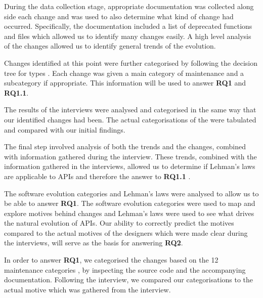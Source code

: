 \documentclass{sig-alternate}
\begin{document}
During the data collection stage, appropriate documentation was collected along side each change and was used to also determine what kind of change had occurred. Specifically, the documentation included a list of deprecated functions and files which allowed us to identify many changes easily. A high level analysis of the changes allowed us to identify general trends of the evolution.

Changes identified at this point were further categorised by following the decision tree for types \cite{chapin2001types}. Each change was given a main category of maintenance and a subcategory if appropriate. This information will be used to answer \textbf{RQ1} and \textbf{RQ1.1}.

The results of the interviews were analysed and categorised in the same way that our identified changes had been. The actual categorisations of the were tabulated and compared with our initial findings.

The final step involved analysis of both the trends and the changes, combined with information gathered during the interview. These trends, combined with the information gathered in the interviews, allowed us to determine if Lehman's laws are applicable to APIs and therefore the answer to \textbf{RQ1.1} \cite{lehman1980programs}.

The software evolution categories \cite{chapin2001types} and Lehman's laws \cite{lehman1980programs} were analysed to allow us to be able to answer \textbf{RQ1}. The software evolution categories were used to map and explore motives behind changes and Lehman's laws were used to see what drives the natural evolution of APIs. Our ability to correctly predict the motives compared to the actual motives of the designers which were made clear during the interviews, will serve as the basis for answering \textbf{RQ2}.

In order to answer \textbf{RQ1}, we categorised the changes based on the 12 maintenance categories \cite{chapin2001types}, by inspecting the source code and the accompanying documentation. Following the interview, we compared our categorisations to the actual motive which was gathered from the interview. 
\end{document}
